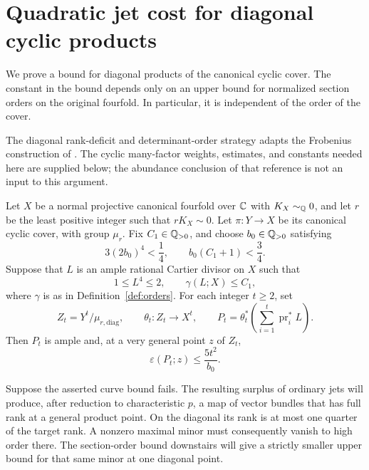 \section{Quadratic jet cost for diagonal cyclic products}
\label{sec:quadratic-cost}

We prove a bound for diagonal products of the canonical cyclic cover.  The
constant in the bound depends only on an upper bound for normalized section
orders on the original fourfold.  In particular, it is independent of the
order of the cover.

The diagonal rank-deficit and determinant-order strategy adapts the
Frobenius construction of \cite[Section~9]{OpenAIAbundance}.
The cyclic many-factor weights, estimates, and constants needed here
are supplied below; the abundance conclusion of that reference is not
an input to this argument.

\begin{proposition}\label{prop:quadratic-cost}
Let $X$ be a normal projective canonical fourfold over $\mathbb C$ with
$K_X\sim_{\mathbb Q}0$, and let $r$ be the least positive integer such that
$rK_X\sim0$.  Let $\pi:Y\to X$ be its canonical cyclic cover, with group
$\mu_r$.  Fix $C_1\in\mathbb Q_{>0}$, and choose $b_0\in\mathbb Q_{>0}$ satisfying
\begin{equation}\label{eq:frob-choice-b0}
 3(2b_0)^4<\frac14,
 \qquad b_0(C_1+1)<\frac34.
\end{equation}
Suppose that $L$ is an ample rational Cartier divisor on $X$ such that
\[
 1\le L^4\le2,
 \qquad \gamma(L;X)\le C_1,
\]
where $\gamma$ is as in Definition~\ref{def:orders}.  For each integer $t\ge2$,
set
\[
 Z_t=Y^t/\mu_{r,\mathrm{diag}},
 \qquad
 \theta_t:Z_t\longrightarrow X^t,
 \qquad
 P_t=\theta_t^*\left(\sum_{i=1}^t\operatorname{pr}_i^*L\right).
\]
Then $P_t$ is ample and, at a very general point $z$ of $Z_t$,
\begin{equation}\label{eq:frob-cost}
 \varepsilon(P_t;z)\le\frac{5t^2}{b_0}.
\end{equation}
\end{proposition}

Suppose the asserted curve bound fails. The resulting surplus of
ordinary jets will produce, after reduction to characteristic $p$, a
map of vector bundles that has full rank at a general product point.
On the diagonal its rank is at most one quarter of the target rank.
A nonzero maximal minor must consequently vanish to high order there.
The section-order bound downstairs will give a strictly smaller upper
bound for that same minor at one diagonal point.

